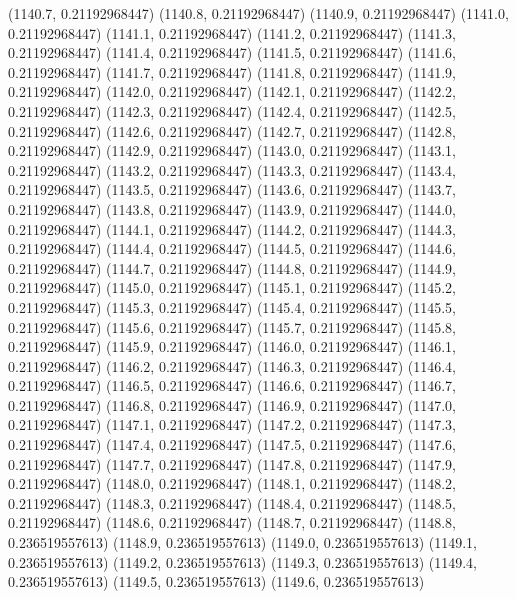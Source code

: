 {					(1140.7, 0.21192968447)
					(1140.8, 0.21192968447)
					(1140.9, 0.21192968447)
					(1141.0, 0.21192968447)
					(1141.1, 0.21192968447)
					(1141.2, 0.21192968447)
					(1141.3, 0.21192968447)
					(1141.4, 0.21192968447)
					(1141.5, 0.21192968447)
					(1141.6, 0.21192968447)
					(1141.7, 0.21192968447)
					(1141.8, 0.21192968447)
					(1141.9, 0.21192968447)
					(1142.0, 0.21192968447)
					(1142.1, 0.21192968447)
					(1142.2, 0.21192968447)
					(1142.3, 0.21192968447)
					(1142.4, 0.21192968447)
					(1142.5, 0.21192968447)
					(1142.6, 0.21192968447)
					(1142.7, 0.21192968447)
					(1142.8, 0.21192968447)
					(1142.9, 0.21192968447)
					(1143.0, 0.21192968447)
					(1143.1, 0.21192968447)
					(1143.2, 0.21192968447)
					(1143.3, 0.21192968447)
					(1143.4, 0.21192968447)
					(1143.5, 0.21192968447)
					(1143.6, 0.21192968447)
					(1143.7, 0.21192968447)
					(1143.8, 0.21192968447)
					(1143.9, 0.21192968447)
					(1144.0, 0.21192968447)
					(1144.1, 0.21192968447)
					(1144.2, 0.21192968447)
					(1144.3, 0.21192968447)
					(1144.4, 0.21192968447)
					(1144.5, 0.21192968447)
					(1144.6, 0.21192968447)
					(1144.7, 0.21192968447)
					(1144.8, 0.21192968447)
					(1144.9, 0.21192968447)
					(1145.0, 0.21192968447)
					(1145.1, 0.21192968447)
					(1145.2, 0.21192968447)
					(1145.3, 0.21192968447)
					(1145.4, 0.21192968447)
					(1145.5, 0.21192968447)
					(1145.6, 0.21192968447)
					(1145.7, 0.21192968447)
					(1145.8, 0.21192968447)
					(1145.9, 0.21192968447)
					(1146.0, 0.21192968447)
					(1146.1, 0.21192968447)
					(1146.2, 0.21192968447)
					(1146.3, 0.21192968447)
					(1146.4, 0.21192968447)
					(1146.5, 0.21192968447)
					(1146.6, 0.21192968447)
					(1146.7, 0.21192968447)
					(1146.8, 0.21192968447)
					(1146.9, 0.21192968447)
					(1147.0, 0.21192968447)
					(1147.1, 0.21192968447)
					(1147.2, 0.21192968447)
					(1147.3, 0.21192968447)
					(1147.4, 0.21192968447)
					(1147.5, 0.21192968447)
					(1147.6, 0.21192968447)
					(1147.7, 0.21192968447)
					(1147.8, 0.21192968447)
					(1147.9, 0.21192968447)
					(1148.0, 0.21192968447)
					(1148.1, 0.21192968447)
					(1148.2, 0.21192968447)
					(1148.3, 0.21192968447)
					(1148.4, 0.21192968447)
					(1148.5, 0.21192968447)
					(1148.6, 0.21192968447)
					(1148.7, 0.21192968447)
					(1148.8, 0.236519557613)
					(1148.9, 0.236519557613)
					(1149.0, 0.236519557613)
					(1149.1, 0.236519557613)
					(1149.2, 0.236519557613)
					(1149.3, 0.236519557613)
					(1149.4, 0.236519557613)
					(1149.5, 0.236519557613)
					(1149.6, 0.236519557613)
}
